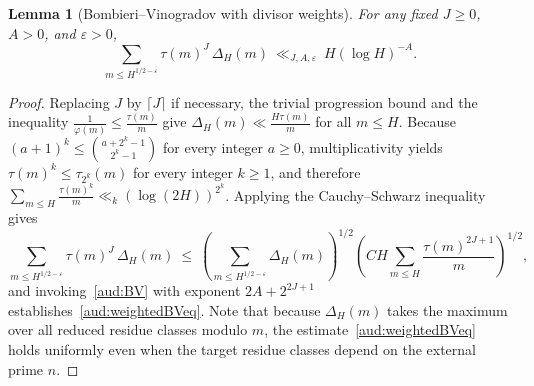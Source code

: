 \documentclass[11pt, a4paper]{article}
\theoremstyle{plain}
\newtheorem{lemma}[theorem]{Lemma}
\theoremstyle{definition}
\begin{document}
\begin{lemma}[Bombieri--Vinogradov with divisor weights]\label{aud:weightedBV}
For any fixed $J\ge0$, $A>0$, and $\varepsilon>0$,
\begin{equation}\label{aud:weightedBVeq}
\sum_{m\le H^{1/2-\varepsilon}}\tau(m)^{J}\,\Delta_H(m)\ \ll_{J,A,\varepsilon}\ H(\log H)^{-A}.
\end{equation}
\end{lemma}
\begin{proof}
Replacing $J$ by $\lceil J\rceil$ if necessary, the trivial progression bound and the inequality $\frac{1}{\varphi(m)}\le\frac{\tau(m)}{m}$ give $\Delta_H(m)\ll\frac{H\tau(m)}{m}$ for all $m\le H$. Because $(a+1)^{k}\le\binom{a+2^{k}-1}{2^{k}-1}$ for every integer $a\ge 0$, multiplicativity yields $\tau(m)^{k}\le\tau_{2^{k}}(m)$ for every integer $k\ge1$, and therefore $\sum_{m\le H}\frac{\tau(m)^{k}}{m}\ll_k(\log(2H))^{2^{k}}$. Applying the Cauchy--Schwarz inequality gives
\[
\sum_{m\le H^{1/2-\varepsilon}}\tau(m)^{J}\,\Delta_H(m)\ \le\ \left(\sum_{m\le H^{1/2-\varepsilon}}\Delta_H(m)\right)^{\!1/2}\left(C H\sum_{m\le H}\frac{\tau(m)^{2J+1}}{m}\right)^{\!1/2},
\]
and invoking~\eqref{aud:BV} with exponent $2A+2^{2J+1}$ establishes~\eqref{aud:weightedBVeq}. Note that because $\Delta_H(m)$ takes the maximum over all reduced residue classes modulo $m$, the estimate~\eqref{aud:weightedBVeq} holds uniformly even when the target residue classes depend on the external prime $n$.
\end{proof}
\end{document}

